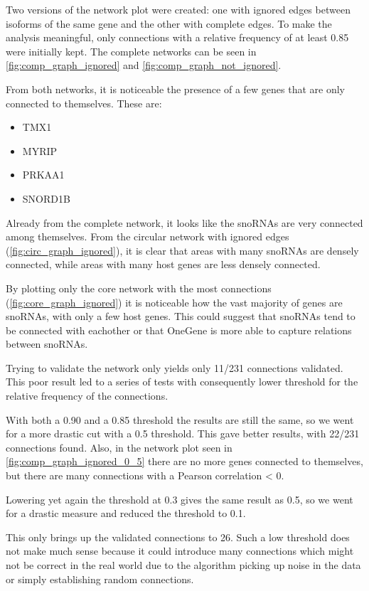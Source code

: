 \documentclass[journal]{IEEEtran}
\begin{document}
Two versions of the network plot were created: one with ignored edges between isoforms of the same gene and the other with complete edges. To make the analysis meaningful, only connections with a relative frequency of at least 0.85 were initially kept. The complete networks can be seen in \cref{fig:comp_graph_ignored} and \cref{fig:comp_graph_not_ignored}.

From both networks, it is noticeable the presence of a few genes that are only connected to themselves. These are:
\begin{itemize}
    \item TMX1
    \item MYRIP
    \item PRKAA1
    \item SNORD1B
\end{itemize}

Already from the complete network, it looks like the snoRNAs are very connected among themselves. From the circular network with ignored edges (\cref{fig:circ_graph_ignored}), it is clear that areas with many snoRNAs are densely connected, while areas with many host genes are less densely connected. 

By plotting only the core network with the most connections (\cref{fig:core_graph_ignored}) it is noticeable how the vast majority of genes are snoRNAs, with only a few host genes. This could suggest that snoRNAs tend to be connected with eachother or that OneGene is more able to capture relations between snoRNAs.

Trying to validate the network only yields only 11/231 connections validated. This poor result led to a series of tests with consequently lower threshold for the relative frequency of the connections.

With both a 0.90 and a 0.85 threshold the results are still the same, so we went for a more drastic cut with a 0.5 threshold. This gave better results, with 22/231 connections found. Also, in the network plot seen in \cref{fig:comp_graph_ignored_0_5} there are no more genes connected to themselves, but there are many connections with a Pearson correlation < 0.

Lowering yet again the threshold at 0.3 gives the same result as 0.5, so we went for a drastic measure and reduced the threshold to 0.1.

This only brings up the validated connections to 26. Such a low threshold does not make much sense because it could introduce many connections which might not be correct in the real world due to the algorithm picking up noise in the data or simply establishing random connections.
\end{document}
